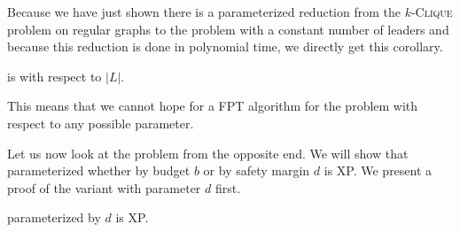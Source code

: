 Because we have just shown there is a parameterized reduction from the $k$-\textsc{Clique} problem on regular graphs to the
\HL problem with a constant number of leaders and because this reduction is done in polynomial time,
we directly get this corollary.

\begin{corollary}
    \HL is \pNPh with respect to $|L|$.
\end{corollary}
This means that we cannot hope for a FPT algorithm for the \HL problem with respect to any possible parameter. 


Let us now look at the problem from the opposite end.
We will show that \HL parameterized whether by budget $b$ or by safety margin $d$ is XP.
We present a proof of the variant with parameter $d$ first.

\begin{theorem}
    \HL parameterized by $d$ is XP.
\end{theorem}

